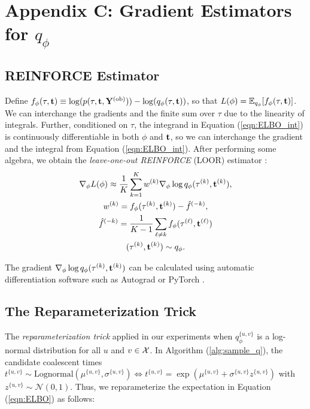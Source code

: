 \newpage

\section*{Appendix C: Gradient Estimators for $q_\phi$}\label{app:c}

\setcounter{section}{3}
\subsection{REINFORCE Estimator}

Define $f_{\phi}(\tau,\mathbf{t}) \equiv \log(p(\tau,\mathbf{t},\mathbf{Y}^{{(\text{ob})}})) - \log(q_{\phi}(\tau,\mathbf{t}))$, so that $L(\phi) = \mathbb{E}_{q_\phi}[f_{\phi}(\tau,\mathbf{t})]$. We can interchange the gradients and the finite sum over $\tau$ due to the linearity of integrals. Further, conditioned on $\tau$, the integrand in Equation (\ref{eqn:ELBO_int}) is continuously differentiable in both $\phi$ and $\mathbf{t}$, so we can interchange the gradient and the integral from Equation (\ref{eqn:ELBO_int}). After performing some algebra, we obtain the \textit{leave-one-out REINFORCE} (LOOR) estimator \citep{Mnih:2014,Shi:2022}: 
%
\begin{gather}
    \nabla_{\phi} L(\phi) \approx \frac{1}{K} \sum_{k=1}^K w^{(k)} \nabla_\phi \log q_\phi (\tau^{(k)},\mathbf{t}^{(k)}),\\ 
    w^{(k)} = f_\phi(\tau^{(k)},\mathbf{t}^{(k)}) - \hat f^{(-k)}, \\
    \hat f^{(-k)} = \frac{1}{K-1} \sum_{\ell \neq k} f_\phi(\tau^{(\ell)},\mathbf{t}^{(\ell)}) \\
    (\tau^{(k)},\mathbf{t}^{(k)}) \sim q_{\phi}. 
\end{gather}

The gradient $\nabla_\phi \log q_\phi (\tau^{(k)},\mathbf{t}^{(k)})$ can be calculated using automatic differentiation software such as Autograd \citep{Maclaurin:2015} or PyTorch \citep{Paszke:2019}. 

\subsection{The Reparameterization Trick}

The \textit{reparameterization trick} applied in our experiments when $q_\phi^{\{u,v\}}$ is a log-normal distribution for all $u$ and $v \in \mathcal{X}$. In Algorithm (\ref{alg:sample_q}), the candidate coalescent times $t^{\{u,v\}} \sim \text{Lognormal}(\mu^{\{u,v\}},\sigma^{\{u,v\}}) \iff t^{\{u,v\}} = \exp(\mu^{\{u,v\}} + \sigma^{\{u,v\}} z^{\{u,v\}})$ with $z^{\{u,v\}} \sim \mathcal{N}(0,1)$. Thus, we reparameterize the expectation in Equation (\ref{eqn:ELBO}) as follows:

